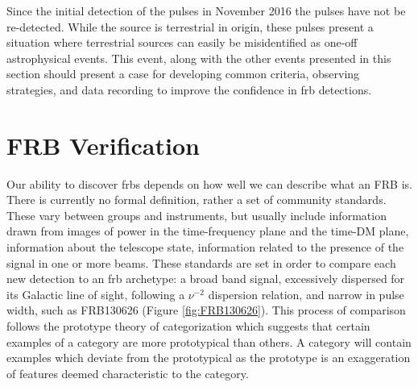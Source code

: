 \documentclass[a4paper,fleqn,usenatbib]{mnras}
\begin{document}
Since the initial detection of the pulses in November 2016 the pulses have not
be re-detected. While the source is terrestrial in origin, these pulses present a
situation where terrestrial sources can easily be misidentified as one-off
astrophysical events. This event, along with the other events presented in this
section should present a case for developing common criteria, observing
strategies, and data recording to improve the confidence in \gls{frb}
detections.

\section{FRB Verification}
\label{sec:verify_crit}

Our ability to discover \glspl{frb} depends on how well we can describe what an
FRB is. There is currently no formal definition, rather a set of community
standards. These vary between groups and instruments, but usually include
information drawn from images of power in the time-frequency plane and the
time-DM plane, information about the telescope state, information related to the
presence of the signal in one or more beams.  These standards are set in order
to compare each new detection to an \gls{frb} archetype: a broad band signal,
excessively dispersed for its Galactic line of sight, following a $\nu^{-2}$
dispersion relation, and narrow in pulse width, such as FRB130626
\citep{2016MNRAS.460L..30C} (Figure \ref{fig:FRB130626}). This process of
comparison follows the prototype theory of categorization \citep{ROSCH1976382}
which suggests that certain examples of a category are more prototypical than
others. A category will contain examples which deviate from the prototypical as
the prototype is an exaggeration of features deemed characteristic to the
category.
\end{document}
